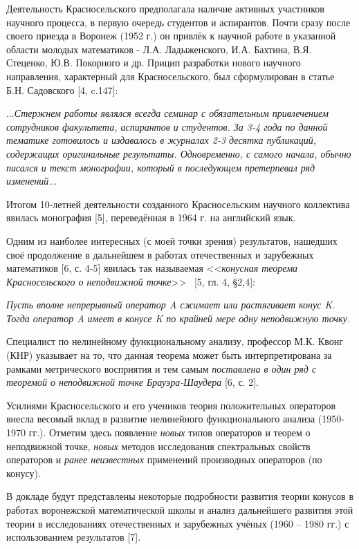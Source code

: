 	Деятельность Красносельского предполагала наличие активных участников научного процесса, в первую очередь студентов и аспирантов. Почти сразу после своего приезда в Воронеж (1952 г.) он привлёк к научной работе в указанной области молодых математиков - Л.А. Ладыженского, И.А. Бахтина, В.Я. Стеценко, Ю.В. Покорного и др. Прицип разработки нового научного направления, характерный для Красносельского, был сформулирован в статье Б.Н. Садовского [4, c.147]:

	{\textquotedbl}
	...\textit{Стержнем работы являлся всегда семинар с обязательным привлечением сотрудников факультета, аспирантов и студентов. За 3-4 года по данной тематике готовилось и издавалось в журналах 2-3 десятка публикаций, содержащих оригинальные результаты. Одновременно, с самого начала, обычно писался и текст монографии, который в последующем претерпевал ряд изменений}...
	{\textquotedbl}

Итогом 10-летней деятельности созданного Красносельским научного коллектива явилась монография [5], переведённая в 1964 г. на английский язык.

Одним из наиболее интересных (с моей точки зрения) результатов, нашедших своё продолжение в дальнейшем в работах отечественных и зарубежных математиков [6, с. 4-5] явилась так называемая <<\textit{конусная теорема Красносельского о неподвижной точке}>> \, [5, гл. 4, §2,4]:

\textit{Пусть вполне непрерывный оператор A сжимает или растягивает конус K. Тогда оператор A имеет в конусе K по крайней мере одну неподвижную точку.}

Специалист по нелинейному функциональному анализу, профессор М.К. Квонг (КНР) указывает на то, что данная теорема может быть интерпретирована за рамками метрического восприятия и тем самым \textit{поставлена в один ряд с теоремой о неподвижной точке Брауэра-Шаудера} [6, с. 2].

Усилиями Красносельского и его учеников теория положительных операторов внесла весомый вклад в развитие нелинейного функционального анализа (1950-1970 гг.). Отметим здесь появление \textit{новых} типов операторов и теорем о неподвижной точке, \textit{новых}	 методов исследования спектральных свойств операторов и\textit{ ранее неизвестных} применений производных операторов (по конусу).

В докладе будут представлены некоторые подробности развития теории конусов в работах воронежской математической школы и анализ дальнейшего развития этой теории в исследованиях отечественных и зарубежных учёных (1960 -- 1980 гг.) с использованием результатов [7].


